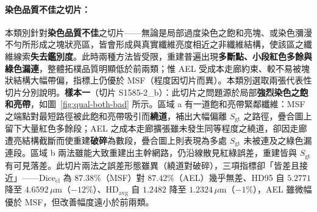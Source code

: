 \paragraph{染色品質不佳之切片：} 本類別針對\textbf{染色品質不佳}之切片——無論是局部過度染色之飽和亮塊、或染色瀰漫不勻所形成之塊狀亮區，皆會形成與真實纖維亮度相近之非纖維結構，使該區之纖維線索\textbf{失去鑑別度}。此時兩種方法皆受限，重建普遍出現\textbf{多斷點、小段紅色多餘與綠色漏連}，整體拓樸品質明顯低於前兩類；惟 AEL 受成本走廊約束、較不易被塊狀結構大幅帶偏，指標上仍優於 MSF（程度因切片而異）。本類別選取兩張代表性切片分別說明。\textbf{樣本一}（切片 S1585-2\_b）：此切片之問題源於局部\textbf{強烈染色之飽和亮帶}，如圖~\ref{fig:qual-both-bad} 所示。區域 a 有一道飽和亮帶緊鄰纖維：MSF 之端點對最短路徑被此飽和亮帶吸引而\textbf{繞道}，補出大幅偏離 $S_{\text{gt}}$ 之路徑，疊合圖上留下大量紅色多餘段；AEL 之成本走廊擴張雖未發生同等程度之繞道，卻因走廊遭亮結構截斷而使重建\textbf{破碎}為數段，疊合圖上則表現為多處 $S_{\text{gt}}$ 未被連及之綠色漏連段。區域 b 兩法雖能大致重建出主幹網路，仍沿線散見紅綠誤差，重建皆與 $S_{\text{gt}}$ 有可見落差。此切片兩法之誤差形態雖異（繞道對破碎），三項指標卻「皆差且接近」——$\text{Dice}_{\text{cl}}$ 為 $87.38\%$（MSF）對 $87.42\%$（AEL）幾乎無差、HD95 自 $5.2771$ 降至 $4.6592\,\mu\text{m}$（$-12\%$）、$\text{HD}_{\text{avg}}$ 自 $1.2482$ 降至 $1.2324\,\mu\text{m}$（$-1\%$），AEL 雖微幅優於 MSF，但改善幅度遠小於前兩類。

